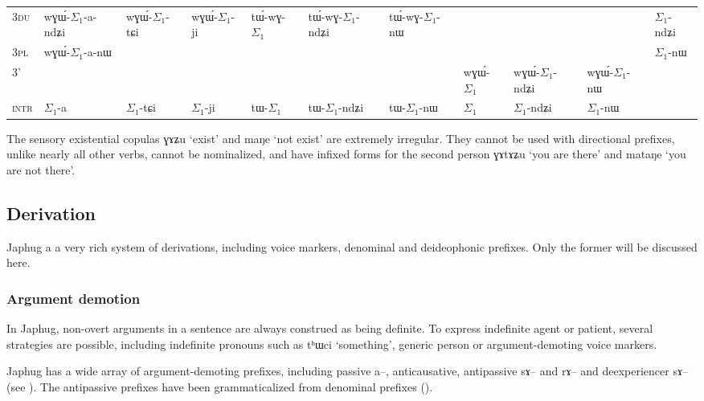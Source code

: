 \documentclass[oldfontcommands,oneside,a4paper,11pt]{article}
\newcommand{\ipa}[1]{{\phon #1}} %
\newcommand{\grise}[1]{\cellcolor{lightgray}\textbf{#1}}
\newcommand{\siga}{$\Sigma_1$}
\begin{document}
\begin{table}[H]
{\begin{tabular}{l|l|l|l|l|l|l|l|l|l|l|}
\cline{2-2}
\cline{11-11}
\textsc{3du} &  	\ipa{wɣɯ́-\siga{}-a-ndʑi} & 	 \ipa{wɣɯ́-\siga{}-tɕi} & 		\ipa{wɣɯ́-\siga{}-ji} & 	\ipa{tɯ́-wɣ-\siga{}} & 	\ipa{tɯ́-wɣ-\siga{}-ndʑi} & 	\ipa{tɯ́-wɣ-\siga{}-nɯ} & 	\multicolumn{3}{c|}{\grise{}} &	\ipa{\siga{}-ndʑi} \\ 
\cline{2-2}	
\cline{11-11}
\textsc{3pl} &  	\ipa{wɣɯ́-\siga{}-a-nɯ} & 	\ipa{} & 	\ipa{} & 	\ipa{} & 	\ipa{} & 	\ipa{} & \multicolumn{3}{c|}{\grise{}} &	\ipa{\siga{}-nɯ} \\ 	
\hline
\textsc{3'} & 	\multicolumn{6}{c|}{\grise{}} &	\ipa{wɣɯ́-\siga{}} & 	\ipa{wɣɯ́-\siga{}-ndʑi} & 	\ipa{wɣɯ́-\siga{}-nɯ} & 	\grise{} \\	
	\hline	\hline
\textsc{intr}&\ipa{\siga{}-a}&\ipa{\siga{}-tɕi}&\ipa{\siga{}-ji}&\ipa{tɯ-\siga{}}&\ipa{tɯ-\siga{}-ndʑi}&\ipa{tɯ-\siga{}-nɯ}&\ipa{\siga{}}&\ipa{\siga{}-ndʑi} &\ipa{\siga{}-nɯ}& 	\grise{} \\	
	\hline
\end{tabular}}
\end{table}

The sensory existential copulas \ipa{ɣɤʑu} `exist' and \ipa{maŋe} `not exist' are extremely irregular. They cannot be used with directional prefixes, unlike nearly all other verbs, cannot be nominalized, and have infixed forms for the second person \ipa{ɣɤtɤʑu} `you are there' and \ipa{mataŋe} `you are not there'.

\subsection{Derivation}
Japhug a a very rich system of derivations, including voice markers, denominal and deideophonic prefixes. Only the former will be discussed here.

\subsubsection{Argument demotion}
In Japhug, non-overt arguments in a sentence are always construed as being definite. To express indefinite agent or patient, several strategies are possible, including indefinite pronouns such as \ipa{tʰɯci} `something', generic person or argument-demoting voice markers.

Japhug has a wide array of argument-demoting prefixes, including passive \ipa{a--}, anticausative, antipassive \ipa{sɤ--} and \ipa{rɤ--} and deexperiencer \ipa{sɤ--} (see \citealt{jacques12demotion}). The antipassive prefixes have been grammaticalized from denominal prefixes (\citealt{jacques14antipassive}).
\end{document}
